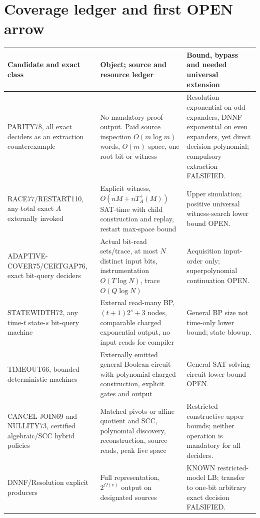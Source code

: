 \documentclass[11pt]{article}
\begin{document}
\section{Coverage ledger and first OPEN arrow}
\small
\begin{longtable}{p{.19\linewidth}p{.28\linewidth}p{.43\linewidth}}\toprule
Candidate and exact class & Object; source and resource ledger & Bound, bypass and needed universal extension\\\midrule\endhead
PARITY78, all exact deciders as an extraction counterexample & No mandatory proof output. Paid source inspection $O(m\log m)$ words, $O(m)$ space, one root bit or witness & Resolution exponential on odd expanders, DNNF exponential on even expanders, yet direct decision polynomial; compulsory extraction FALSIFIED.\\
RACE77/RESTART110, any total exact $A$ externally invoked & Explicit witness, $O(nM+nT_A^+(M))$ SAT-time with child construction and replay, restart max-space bound & Upper simulation; positive universal witness-search lower bound OPEN.\\
ADAPTIVE-COVER75/CERTGAP76, exact bit-query deciders & Actual bit-read sets/trace, at most $N$ distinct input bits, instrumentation $O(T\log N)$, trace $O(Q\log N)$ & Acquisition input-order only; superpolynomial continuation OPEN.\\
STATEWIDTH72, any time-$t$ state-$s$ bit-query machine & External read-many BP, $(t+1)2^s+3$ nodes, comparable charged exponential output, no input reads for compiler & General BP size not time-only lower bound; state blowup.\\
TIMEOUT66, bounded deterministic machines & Externally emitted general Boolean circuit with polynomial charged construction, explicit gates and output & General SAT-solving circuit lower bound OPEN.\\
CANCEL-JOIN69 and NULLITY73, certified algebraic/SCC hybrid policies & Matched pivots or affine quotient and SCC, polynomial discovery, reconstruction, source reads, peak live space & Restricted constructive upper bounds; neither operation is mandatory for all deciders.\\
DNNF/Resolution explicit producers & Full representation, $2^{\Omega(v)}$ output on designated sources & KNOWN restricted-model LB; transfer to one-bit arbitrary exact decision FALSIFIED.\\
\bottomrule
\end{longtable}
\normalsize
\end{document}
